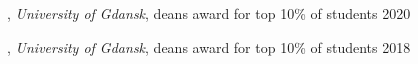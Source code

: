 , \textit{University of Gdansk}, deans award for top 10\% of students	\hfill 2020 

, \textit{University of Gdansk}, deans award for top 10\% of students \hfill 2018




